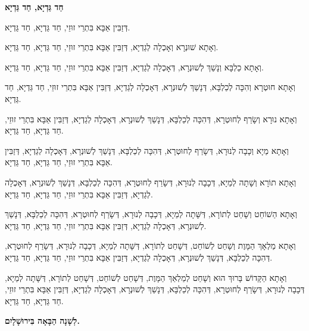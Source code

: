 \begin{center}
{\bfseries
חַד גַּדְיָא, חַד גַּדְיָא
}

דְּזַבִּין אַבָּא בִּתְרֵי זוּזֵי, חַד גַּדְיָא, חַד גַּדְיָא.

וְאָתָא שׁוּנְרָא וְאָכְלָה לְגַדְיָא, דְּזַבִּין אַבָּא בִּתְרֵי זוּזֵי, חַד גַּדְיָא, חַד גַּדְיָא.

וְאָתָא כַלְבָּא וְנָשַׁךְ לְשׁוּנְרָא, דְּאָכְלָה לְגַדְיָא, דְּזַבִּין אַבָּא בִּתְרֵי זוּזֵי, חַד גַּדְיָא, חַד גַּדְיָא.

וְאָתָא חוּטְרָא וְהִכָּה לְכַלְבָּא, דְּנָשַׁךְ לְשׁוּנְרָא, דְּאָכְלָה לְגַדְיָא, דְּזַבִּין אַבָּא בִּתְרֵי זוּזֵי, חַד גַּדְיָא, חַד גַּדְיָא.

וְאָתָא נוּרָא וְשָׂרַף לְחוּטְרָא, דְּהִכָּה לְכַלְבָּא, דְּנָשַׁךְ לְשׁוּנְרָא, דְּאָכְלָה לְגַדְיָא, דְּזַבִּין אַבָּא בִּתְרֵי זוּזֵי, חַד גַּדְיָא, חַד גַּדְיָא.

וְאָתָא מַיָא וְכָבָה לְנוּרָא, דְּשָׂרַף לְחוּטְרָא, דְּהִכָּה לְכַלְבָּא, דְּנָשַׁךְ לְשׁוּנְרָא, דְּאָכְלָה לְגַדְיָא, דְּזַבִּין אַבָּא בִּתְרֵי זוּזֵי, חַד גַּדְיָא, חַד גַּדְיָא.

וְאָתָא תוֹרָא וְשָׁתָה לְמַיָא, דְּכָבָה לְנוּרָא, דְּשָׂרַף לְחוּטְרָא, דְּהִכָּה לְכַלְבָּא, דְּנָשַׁךְ לְשׁוּנְרָא, דְּאָכְלָה לְגַדְיָא, דְּזַבִּין אַבָּא בִּתְרֵי זוּזֵי, חַד גַּדְיָא, חַד גַּדְיָא.

וְאָתָא הַשׁוֹחֵט וְשָׁחַט לְתוֹרָא, דְּשָּׁתָה לְמַיָא, דְּכָבָה לְנוּרָא, דְּשָׂרַף לְחוּטְרָא, דְּהִכָּה לְכַלְבָּא, דְּנָשַׁךְ לְשׁוּנְרָא, דְּאָכְלָה לְגַדְיָא, דְּזַבִּין אַבָּא בִּתְרֵי זוּזֵי, חַד גַּדְיָא, חַד גַּדְיָא.

וְאָתָא מַלְאָךְ הַמָּוֶת וְשָׁחַט לְשׁוֹחֵט, דְּשָׁחַט לְתוֹרָא, דְּשָּׁתָה לְמַיָא, דְּכָבָה לְנוּרָא, דְּשָׂרַף לְחוּטְרָא, דְּהִכָּה לְכַלְבָּא, דְּנָשַׁךְ לְשׁוּנְרָא, דְּאָכְלָה לְגַדְיָא, דְּזַבִּין אַבָּא בִּתְרֵי זוּזֵי, חַד גַּדְיָא, חַד גַּדְיָא.

וְאָתָא הַקָּדוֹשׁ בָּרוּךְ הוּא וְשָׁחַט לְמַלְאַךְ הַמָּוֶת, דְּשָׁחַט לְשׁוֹחֵט, דְּשָׁחַט לְתוֹרָא, דְּשָּׁתָה לְמַיָא, דְּכָבָה לְנוּרָא, דְּשָׂרַף לְחוּטְרָא, דְּהִכָּה לְכַלְבָּא, דְּנָשַׁךְ לְשׁוּנְרָא, דְּאָכְלָה לְגַדְיָא, דְּזַבִּין אַבָּא בִּתְרֵי זוּזֵי, חַד גַּדְיָא, חַד גַּדְיָא.
\end{center}

{\Huge \bfseries
 לְשָׁנָה הַבָּאָה בִּירוּשָׁלָיִם.
}